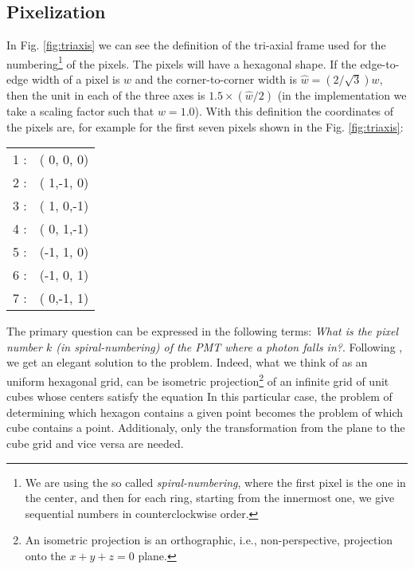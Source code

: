 \zonesfig


\subsection{Pixelization}
\label{sec:pixelization}

In Fig. \ref{fig:triaxis} we can see the definition of the tri-axial
frame used for the numbering\footnote{We are using the so called
  \emph{spiral-numbering}, where the first pixel is the one in the
  center, and then for each ring, starting from the innermost one, we
  give sequential numbers in counterclockwise order.} of the pixels.
The pixels will have a hexagonal shape. If the edge-to-edge width of a
pixel is $w$ and the corner-to-corner width is $\hat{w}=(2/\sqrt{3})
w$, then the unit in each of the three axes is $1.5\times (\hat{w}/2)$
(in the implementation we take a scaling factor such that $w=1.0$).
With this definition the coordinates of the pixels are, for example
for the first seven pixels shown in the Fig. \ref{fig:triaxis}:
%
\begin{center}
  \begin{tabular}{rc}
    1 :& ( 0, 0, 0) \\
    2 :& ( 1,-1, 0) \\
    3 :& ( 1, 0,-1) \\
    4 :& ( 0, 1,-1) \\
    5 :& (-1, 1, 0) \\
    6 :& (-1, 0, 1) \\
    7 :& ( 0,-1, 1) \\
  \end{tabular}
\end{center}

The primary question can be expressed in the following terms:
\emph{What is the pixel number $k$ (in spiral-numbering) of the PMT
  where a photon falls in?}.  Following \cite{Fu:hexgrid}, we get an
elegant solution to the problem. Indeed, what we think of as an
uniform hexagonal grid, can be isometric projection\footnote{An
  isometric projection is an orthographic, i.e., non-perspective,
  projection onto the $x+y+z=0$ plane.} of an infinite grid of unit
cubes whose centers satisfy the equation
%
\planeeq
%
In this particular case, the problem of determining which hexagon
contains a given point becomes the problem of which cube contains a
point.  Additionaly, only the transformation from the plane to the
cube grid and vice versa are needed.

